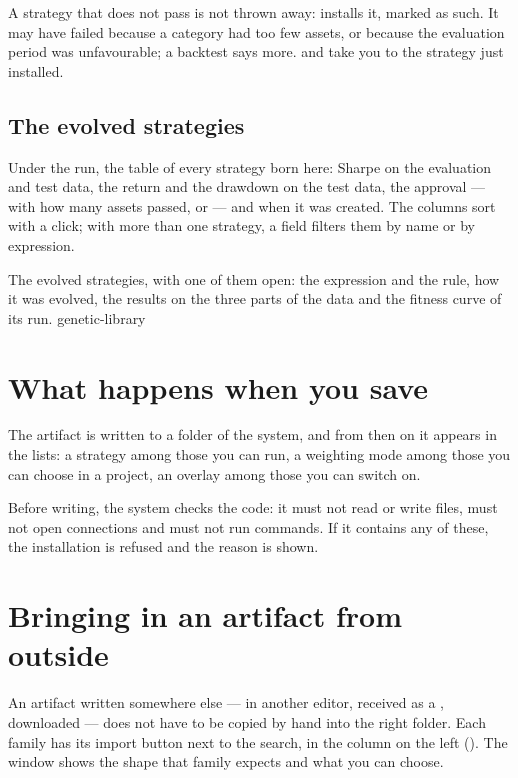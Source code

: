 \noindent
A strategy that does not pass is not thrown away:  installs it, marked as such. It may have failed because a category
had too few assets, or because the evaluation period was unfavourable; a
backtest says more.  and
 take you to the strategy just installed.

\subsection{The evolved strategies}

Under the run, the table of every strategy born here: Sharpe on the
evaluation and test data, the return and the drawdown on the test data, the
approval ---  with how many assets passed, or
 --- and when it was created. The columns sort with a
click; with more than one strategy, a field filters them by name or by
expression.

  {The evolved strategies, with one of them open: the expression and the
   rule, how it was evolved, the results on the three parts of the data and
   the fitness curve of its run.}
  {genetic-library}

\section{What happens when you save}\label{sez:studio-install}

The artifact is written to a folder of the system, and from then on it
appears in the lists: a strategy among those you can run, a weighting mode
among those you can choose in a project, an overlay among those you can
switch on.

Before writing, the system checks the code: it must not read or write files,
must not open connections and must not run commands. If it contains any of
these, the installation is refused and the reason is shown.

\section{Bringing in an artifact from outside}\label{sez:studio-import}

An artifact written somewhere else --- in another editor, received as a
, downloaded --- does not have to be copied by hand into the right
folder. Each family has its import button next to the search, in the
column on the left (). The window shows the shape that
family expects and what you can choose.

